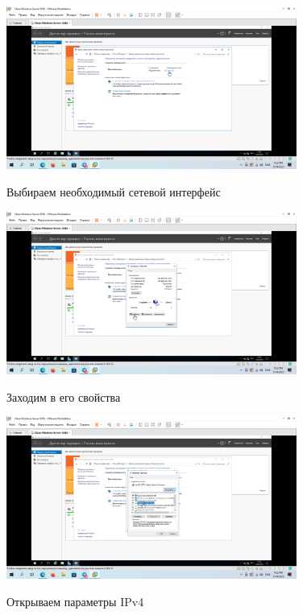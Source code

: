 \documentclass[a4paper]{article}
\begin{document}
  \begin{figure}[H]
    \centering
    \includegraphics[width=0.85\textwidth]{5_0016}
    \label{img:16}
    \caption{Выбираем необходимый сетевой интерфейс}
  \end{figure}

  \begin{figure}[H]
    \centering
    \includegraphics[width=0.85\textwidth]{5_0017}
    \label{img:17}
    \caption{Заходим в его свойства}
  \end{figure}

  \begin{figure}[H]
    \centering
    \includegraphics[width=0.85\textwidth]{5_0018}
    \label{img:18}
    \caption{Открываем параметры IPv4}
  \end{figure}
\end{document}
